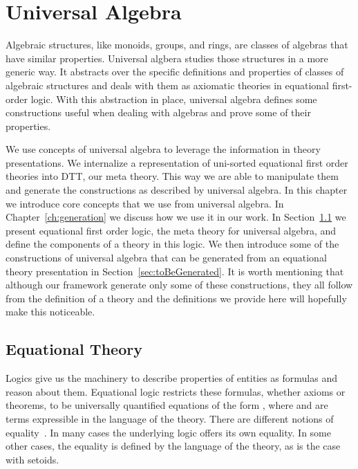 \chapter{Universal Algebra}
\label{ch:ualgebra}
Algebraic structures, like monoids, groups, and rings, are classes of algebras that have similar properties. Universal algbera studies those structures in a more generic way. It abstracts over the specific definitions and properties of classes of algebraic structures and deals with them as axiomatic theories in equational first-order logic. With this abstraction in place, universal algebra defines some constructions useful when dealing with algebras and prove some of their properties.

We use concepts of universal algebra to leverage the information in theory presentations. We internalize a representation of uni-sorted equational first order theories into DTT, our meta theory. This way we are able to manipulate them and generate the constructions as described by universal algebra. In this chapter we introduce core concepts that we use from universal algebra. In Chapter~\ref{ch:generation} we discuss how we use it in our work. In Section~\ref{sec:eqtheory} we present equational first order logic, the meta theory for universal algebra, and define the components of a theory in this logic. We then introduce some of the constructions of universal algebra that can be generated from an equational theory presentation in Section~\ref{sec:toBeGenerated}. It is worth mentioning that although our framework generate only some of these constructions, they all follow from the definition of a theory and the definitions we provide here will hopefully make this noticeable.   

\section{Equational Theory}
\label{sec:eqtheory}
Logics give us the machinery to describe properties of entities as formulas and reason about them.  
Equational logic restricts these formulas, whether axioms or theorems, to be universally quantified equations of the form , where  and   are terms expressible in the language of the theory. There are different notions of equality~\cite{oneThingSame2008, equalityInTPs2015}. In many cases the underlying logic offers its own equality. In some other cases, the equality is defined by the language of the theory, as is the case with setoids. 

